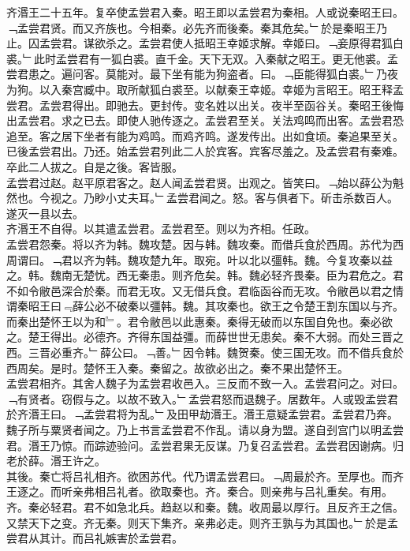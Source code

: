 \documentclass{zhvt-classic}
\begin{document}
\hspace*{2em}齐湣王二十五年。复卒使孟尝君入秦。昭王即以孟尝君为秦相。人或说秦昭王曰。﹁孟尝君贤。而又齐族也。今相秦。必先齐而後秦。秦其危矣。﹂於是秦昭王乃止。囚孟尝君。谋欲杀之。孟尝君使人抵昭王幸姬求解。幸姬曰。﹁妾原得君狐白裘。﹂此时孟尝君有一狐白裘。直千金。天下无双。入秦献之昭王。更无他裘。孟尝君患之。遍问客。莫能对。最下坐有能为狗盗者。曰。﹁臣能得狐白裘。﹂乃夜为狗。以入秦宫臧中。取所献狐白裘至。以献秦王幸姬。幸姬为言昭王。昭王释孟尝君。孟尝君得出。即驰去。更封传。变名姓以出关。夜半至函谷关。秦昭王後悔出孟尝君。求之已去。即使人驰传逐之。孟尝君至关。关法鸡鸣而出客。孟尝君恐追至。客之居下坐者有能为鸡鸣。而鸡齐鸣。遂发传出。出如食顷。秦追果至关。已後孟尝君出。乃还。始孟尝君列此二人於宾客。宾客尽羞之。及孟尝君有秦难。卒此二人拔之。自是之後。客皆服。\\
\hspace*{2em}孟尝君过赵。赵平原君客之。赵人闻孟尝君贤。出观之。皆笑曰。﹁始以薛公为魁然也。今视之。乃眇小丈夫耳。﹂孟尝君闻之。怒。客与俱者下。斫击杀数百人。遂灭一县以去。\\
\hspace*{2em}齐湣王不自得。以其遣孟尝君。孟尝君至。则以为齐相。任政。\\
\hspace*{2em}孟尝君怨秦。将以齐为韩。魏攻楚。因与韩。魏攻秦。而借兵食於西周。苏代为西周谓曰。﹁君以齐为韩。魏攻楚九年。取宛。叶以北以彊韩。魏。今复攻秦以益之。韩。魏南无楚忧。西无秦患。则齐危矣。韩。魏必轻齐畏秦。臣为君危之。君不如令敝邑深合於秦。而君无攻。又无借兵食。君临函谷而无攻。令敝邑以君之情谓秦昭王曰﹃薛公必不破秦以彊韩。魏。其攻秦也。欲王之令楚王割东国以与齐。而秦出楚怀王以为和﹄。君令敝邑以此惠秦。秦得无破而以东国自免也。秦必欲之。楚王得出。必德齐。齐得东国益彊。而薛世世无患矣。秦不大弱。而处三晋之西。三晋必重齐。﹂薛公曰。﹁善。﹂因令韩。魏贺秦。使三国无攻。而不借兵食於西周矣。是时。楚怀王入秦。秦留之。故欲必出之。秦不果出楚怀王。\\
\hspace*{2em}孟尝君相齐。其舍人魏子为孟尝君收邑入。三反而不致一入。孟尝君问之。对曰。﹁有贤者。窃假与之。以故不致入。﹂孟尝君怒而退魏子。居数年。人或毁孟尝君於齐湣王曰。﹁孟尝君将为乱。﹂及田甲劫湣王。湣王意疑孟尝君。孟尝君乃奔。魏子所与粟贤者闻之。乃上书言孟尝君不作乱。请以身为盟。遂自刭宫门以明孟尝君。湣王乃惊。而踪迹验问。孟尝君果无反谋。乃复召孟尝君。孟尝君因谢病。归老於薛。湣王许之。\\
\hspace*{2em}其後。秦亡将吕礼相齐。欲困苏代。代乃谓孟尝君曰。﹁周最於齐。至厚也。而齐王逐之。而听亲弗相吕礼者。欲取秦也。齐。秦合。则亲弗与吕礼重矣。有用。齐。秦必轻君。君不如急北兵。趋赵以和秦。魏。收周最以厚行。且反齐王之信。又禁天下之变。齐无秦。则天下集齐。亲弗必走。则齐王孰与为其国也。﹂於是孟尝君从其计。而吕礼嫉害於孟尝君。\\
\end{document}

